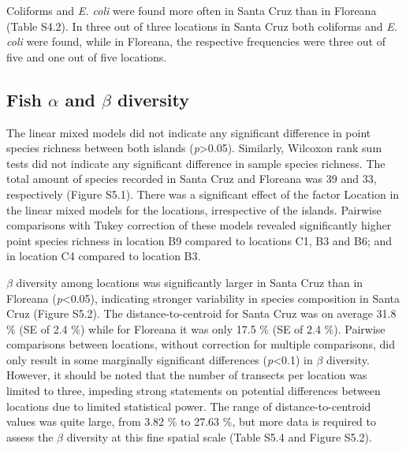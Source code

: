 Coliforms and \textit{E. coli} were found more often in Santa Cruz than in Floreana (Table S4.2). In three out of three locations in Santa Cruz both coliforms and \textit{E. coli} were found, while in Floreana, the respective frequencies were three out of five and one out of five locations. 

\FloatBarrier

\subsection{Fish $\alpha$ and $\beta$ diversity}

The linear mixed models did not indicate any significant difference in point species richness between both islands (\textit{p}>0.05). Similarly, Wilcoxon rank sum tests did not indicate any significant difference in sample species richness. The total amount of species recorded in Santa Cruz and Floreana was 39 and 33, respectively (Figure S5.1). There was a significant effect of the factor Location in the linear mixed models for the locations, irrespective of the islands. Pairwise comparisons with Tukey correction of these models revealed significantly higher point species richness in location B9 compared to locations C1, B3 and B6; and in location C4 compared to location B3. 

$\beta$ diversity among locations was significantly larger in Santa Cruz than in Floreana (\textit{p}<0.05), indicating stronger variability in species composition in Santa Cruz (Figure S5.2). The distance-to-centroid for Santa Cruz was on average 31.8 \% (SE of 2.4 \%) while for Floreana it was only 17.5 \% (SE of 2.4 \%). Pairwise comparisons between locations, without correction for multiple comparisons, did only result in some marginally significant differences (\textit{p}<0.1) in $\beta$ diversity. However, it should be noted that the number of transects per location was limited to three, impeding strong statements on potential differences between locations due to limited statistical power. The range of distance-to-centroid values was quite large, from 3.82 \% to 27.63 \%, but more data is required to assess the $\beta$ diversity at this fine spatial scale (Table S5.4 and Figure S5.2).

